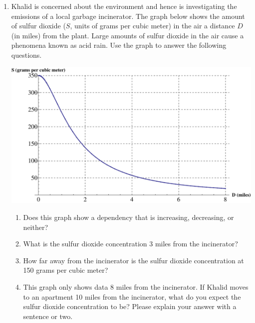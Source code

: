 \documentclass[12pt]{article}
\begin{document}
\hrulefill


\newpage

\begin{enumerate}
\item Khalid is concerned about the environment and hence is investigating the emissions of a local garbage incinerator.  The graph below shows the amount of sulfur dioxide ($S$, units of grams per cubic meter) in the air a distance $D$ (in miles) from the plant. Large amounts of sulfur dioxide in the air cause a phenomena known as acid rain. Use the graph to answer the following questions.

\begin{center}
 {\includegraphics [width = 8in] {garbageEmissions_A}}
\end{center}



\begin{enumerate}
\item Does this graph show a dependency that is increasing, decreasing, or neither?
\vfill
\item What is the sulfur dioxide concentration 3 miles from the incinerator?
\vfill
\item How far away from the incinerator is the sulfur dioxide concentration at 150 grams per cubic meter?
\vfill
\item This graph only shows data 8 miles from the incinerator.  If Khalid moves to an apartment 10 miles from the incinerator, what do you expect the sulfur dioxide concentration to be?  Please explain your answer with a sentence or two.
\vfill
\end{enumerate}


\newpage


\end{enumerate}
\end{document}
